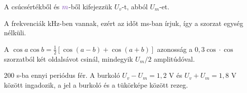 \begin{center}\end{center}

A csúcsértékből és ${\cc{m}}$-ből kifejezzük $U_v$-t, abból $U_m$-et.

\begin{center}\end{center}

\begin{center}\end{center}

A frekvenciák kHz-ben vannak, ezért az időt ms-ban írjuk, így a szorzat egység nélküli.

\begin{center}\end{center}

A $\cos a\cos b=\tfrac12[\cos(a-b)+\cos(a+b)]$ azonosság a $0{,}3\cos\cdot\cos$ szorzatból két oldalsávot csinál, mindegyik $U_m/2$ amplitúdóval.

\begin{center}\end{center}

\begin{center}\end{center}

200 \textmu{}s-ba ennyi periódus fér. A burkoló $U_v-U_m=1{,}2$ V és $U_v+U_m=1{,}8$ V között ingadozik, a jel a burkoló és a tükörképe között rezeg.

